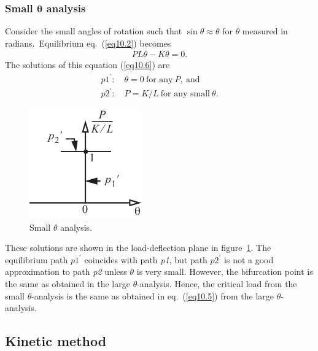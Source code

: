\documentclass{AeroStructure-ERJohnson}
\begin{document}
\subsubsection{Small $\boldsymbol{\theta}$ analysis} Consider the small angles of rotation such that $\sin \theta \approx \theta$ for $\theta$ measured in radians.~Equili\-brium eq.~(\ref{eq10.2}) becomes\vspace*{-6pt}
\begin{align}\label{eq10.6}
P L \theta-K \theta=0.
\end{align}
The solutions of this equation (\ref{eq10.6}) are\vspace*{-6pt}
\begin{align}\label{eq10.7}
p 1^{\prime}: \quad \theta=0\ \text{for any}\ P,\ \text{and}\\
\label{eq10.8}
p 2^{\prime}: \quad P=K / L\ \text{for any small}\ \theta.
\end{align}
\begin{figure}
\vspace{-19pt}
\includegraphics{Figure_10-3.pdf}
\caption{Small $\theta$ analysis.\label{fig10.3}}
\end{figure}
These solutions are shown in the load-deflection plane in figure~\ref{fig10.3}. The equilibrium path $p 1^{\prime}$ coincides with path \textit{p1}, but path $p 2^{\prime}$ is not a good approximation to path \textit{p2} unless $\theta$ is very small. However, the bifurcation point is the same as obtained in the large $\theta$-analysis. Hence, the critical load from the small $\theta$-analysis is the same as obtained in eq.~(\ref{eq10.5}) from the large $\theta$-analysis.%




\subsection{Kinetic method}\label{sec10.1.2}
\end{document}
